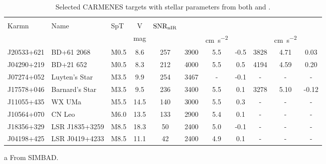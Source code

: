 
\begin{table}[h]
    \centering
    \begin{threeparttable}
        \caption[CARMENES targets for RV precision analysis.]{Selected {CARMENES} targets with stellar parameters from both \citet{rajpurohit_exploring_2018} and \citet{passegger_carmenes_2018}.}
        \begin{tabular}{lllcccccccc}
            \toprule
            & & & & & \multicolumn{3}{c}{\citet{rajpurohit_exploring_2018}} & \multicolumn{3}{c}{\citet{passegger_carmenes_2018}} \\
            Karmn & Name & SpT & V & \(\textrm{SNR}{}_{\textrm{nIR}{}}\) & \Teff{} & \Logg{} & \feh{} & \Teff{} & \Logg{} & \feh{} \\
            &  &  & mag &  & \K{} & \si{\centi\metre\per\second\squared} & & \K{} & \si{\centi\metre\per\second\squared} &  \\
            \midrule
            J20533+621 & BD+61 2068     & M0.5 & 8.6  & 257 & 3900          & 5.5 & -0.5           & 3828 & 4.71 & 0.03 \\
            J04290+219 & BD+21 652      & M0.5 & 8.3  & 212 & 4000          & 5.5 & 0.5            & 4194 & 4.59 & 0.20 \\
            J07274+052 & Luyten's Star  & M3.5 & 9.9  & 254 & 3467\tnote{a} & -   & -0.1\tnote{a}  & -    & -    & -    \\
            J17578+046 & Barnard's Star & M3.5 & 9.5  & 236 & 3400          & 5.5 & 0.1            & 3278 & 5.10 & -0.12 \\
            J11055+435 & WX UMa         & M5.5 & 14.5 & 140 & 3000          & 5.5 & 0.3 & - & - & - \\
            J10564+070 & CN Leo         & M6.0 & 13.5 & 133 & 2900          & 5.4 & 0.1 & - & - & - \\
            J18356+329 & LSR J1835+3259 & M8.5 & 18.3 & 50  & 2400          & 5.0 &-0.1 & - & - & - \\
            J04198+425 & LSR J0419+4233 & M8.5 & 11.1 & 42  & 2400          & 4.9 & 0.1 & - & - & - \\
        \bottomrule
        \end{tabular}\label{tab:carmenes_selection_updated}
        \begin{tablenotes}
            \item [a] {From SIMBAD.}
        \end{tablenotes}
    \end{threeparttable}
\end{table}
